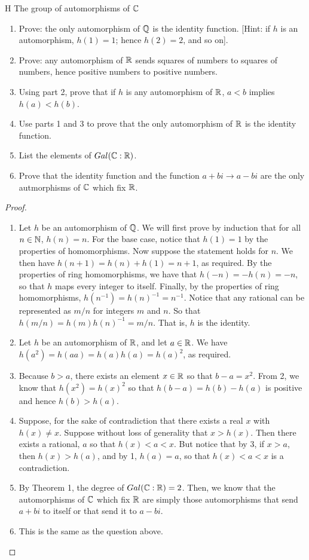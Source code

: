 \begin{exercise}{H The group of automorphisms of $\mathbb{C}$}
\begin{enumerate}
    \item Prove: the only automorphism of $\mathbb{Q}$ is the identity function. [Hint: if $h$ is an automorphism, $h(1)=1$; hence $h(2)=2$, and so on].
    \item Prove: any automorphism of $\mathbb{R}$ sends squares of numbers to squares of numbers, hence positive numbers to positive numbers.
    \item Using part 2, prove that if $h$ is any automorphism of $\mathbb{R}$, $a<b$ implies $h(a)<h(b)$.
    \item Use parts 1 and 3 to prove that the only automorphism of $\mathbb{R}$ is the identity function.
     \item List the elements of $Gal(\mathbb{C}:\mathbb{R})$.
     \item Prove that the identity function and the function $a+bi\rightarrow a-bi$ are the only autmorphisms of $\mathbb{C}$ which fix $\mathbb{R}$.
\end{enumerate}
\end{exercise}
\begin{proof}
 \begin{enumerate}
     \item Let $h$ be an automorphism of $\mathbb{Q}$. We will first prove by induction that for all $n\in\mathbb{N}$, $h(n)=n$. For the base case, notice that $h(1)=1$ by the properties of homomorphisms. Now suppose the statement holds for $n$. We then have $h(n+1)=h(n)+h(1)=n+1$, as required. By the properties of ring homomorphisms, we have that $h(-n)=-h(n)=-n$, so that $h$ maps every integer to itself. Finally, by the properties of ring homomorphisms, $h(n^{-1})=h(n)^{-1}=n^{-1}$. Notice that any rational can be represented as $m/n$ for integers $m$ and $n$. So that $h(m/n)=h(m)h(n)^{-1}=m/n$. That is, $h$ is the identity.
     \item Let $h$ be an automorphism of $\mathbb{R}$, and let $a\in\mathbb{R}$. We have $h(a^2)=h(aa)=h(a)h(a)=h(a)^2$, as required.
     \item Because $b>a$, there exists an element $x\in\mathbb{R}$ so that $b-a=x^2$. From 2, we know that $h(x^2)=h(x)^2$ so that $h(b-a)=h(b)-h(a)$ is positive and hence $h(b)>h(a)$.
     \item Suppose, for the sake of contradiction that there exists a real $x$ with $h(x)\neq x$. Suppose without loss of generality that $x>h(x)$. Then there exists a rational, $a$ so that $h(x)<a<x$. But notice that by 3, if $x>a$, then $h(x)>h(a)$, and by 1, $h(a)=a$, so that $h(x)<a<x$ is a contradiction.
     \item By Theorem 1, the degree of $Gal(\mathbb{C}:\mathbb{R})=2$. Then, we know that the automorphisms of $\mathbb{C}$ which fix $\mathbb{R}$ are simply those automorphisms that send $a+bi$ to itself or that send it to $a-bi$.
     \item This is the same as the question above.
 \end{enumerate}
\end{proof}

